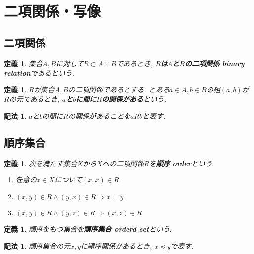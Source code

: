 \documentclass[dvipdfmx]{jsbook}
\theoremstyle{plain}
\newtheorem{Def}[thm]{定義}
\newtheorem{Notation}[thm]{記法}
\begin{document}
\section{二項関係・写像}
\subsection{二項関係}
\begin{Def}
集合$A,B$に対して$R\subset A\times B$であるとき, {\bf $R$は$A$と$B$の二項関係 binary relation}であるという.
\end{Def}
\begin{Def}
$R$が集合$A,B$の二項関係であるとする. 
とある$a\in A, b\in B$の組$(a,b)$が$R$の元であるとき,
{\bf $a$と$b$に間に$R$の関係がある}という.
\end{Def}
\begin{Notation}
$a$と$b$の間に$R$の関係があることを$aRb$と表す.
\end{Notation}
\subsection{順序集合}
\begin{Def}
次を満たす集合$X$から$X$への二項関係$R$を{\bf 順序 order}という.
\begin{enumerate}
\item 任意の$x\in X$について$(x,x)\in R$
\item $(x,y)\in R\land(y,x)\in R\Rightarrow x=y$
\item $(x,y)\in R\land (y,z)\in R
\Rightarrow (x,z)\in R$
\end{enumerate}
\end{Def}
\begin{Def}
順序をもつ集合を{\bf 順序集合 orderd set}という.
\end{Def}
\begin{Notation}
順序集合の元$x,y$に順序関係があるとき, $x\preceq y$で表す.
\end{Notation}
\end{document}

